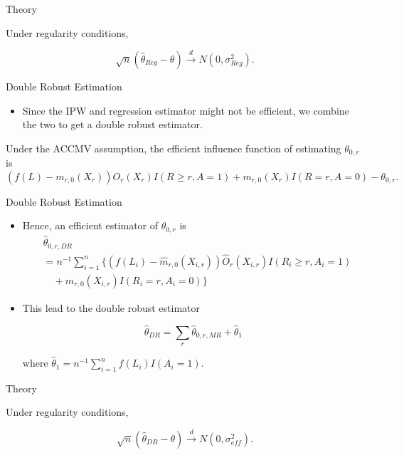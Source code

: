 \documentclass{beamer} %
\begin{document}
\begin{frame}{Theory}
  \begin{theorem}
    Under regularity conditions,

    \[\sqrt n (\hat \theta_{Reg} - \theta) \stackrel{d}{\to} N(0, \sigma_{Reg}^2).\]
  \end{theorem}
\end{frame}

\begin{frame}{Double Robust Estimation}
  \begin{itemize}
    \item Since the IPW and regression estimator might not be efficient, we
      combine the two to get a double robust estimator.
  \end{itemize}

  \begin{theorem}
    Under the ACCMV assumption, the efficient influence function of estimating
    $\theta_{0,r}$ is 
    {\small
    \[(f(L) - m_{r,0}(X_r))O_r(X_r)I(R \geq r, A = 1) + m_{r,0}(X_r)I(R = r, A =
      0) - \theta_{0, r}.\]
    }
  \end{theorem}
\end{frame}

\begin{frame}{Double Robust Estimation}
  \begin{itemize}
    \item Hence, an efficient estimator of $\theta_{0,r}$ is 
      \begin{align*}
        &\hat \theta_{0,r,DR} \\
        &= n^{-1} \sum_{i = 1}^n \{ (f(L_i) - \hat m_{r, 0}(X_{i,r}))
          \hat O_r(X_{i,r}) I(R_i \geq r, A_i = 1) \\
        &\quad+ \hat m_{r, 0}(X_{i,r})I(R_i = r, A_i = 0)\}
        \end{align*}
    \item This lead to the double robust estimator

      \[\hat \theta_{DR} = \sum_r \hat \theta_{0,r, MR} + \hat \theta_1\]

      where $\hat \theta_1 = n^{-1} \sum_{i = 1}^n f(L_i)I(A_i = 1)$.
  \end{itemize}
\end{frame}

\begin{frame}{Theory}
  \begin{theorem}
    Under regularity conditions,

    \[\sqrt n (\hat \theta_{DR} - \theta) \stackrel{d}{\to} N(0, \sigma_{eff}^2).\]
  \end{theorem}
\end{frame}
\end{document}
